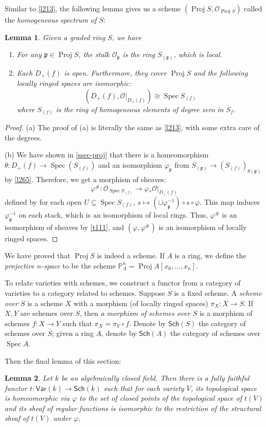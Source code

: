 \documentclass[12pt]{article}
\newtheorem{lemma}{Lemma}[subsection]
\theoremstyle{remark}
\newcommand{\Spec}[0]{\operatorname{Spec}}
\newcommand{\Proj}[0]{\operatorname{Proj}}
\newcommand{\Sch}[0]{\mathsf{Sch}}
\begin{document}
	Similar to \autoref{l213}, the following lemma gives us a scheme $(\Proj S, \mathscr O_{\Proj S})$ called the \textit{homogeneous spectrum of $S$}:
	\begin{lemma}\label{l271}
		Given a graded ring $S$, we have
		\begin{enumerate}[\normalfont(a)]
			\item For any $\mathfrak p\in\Proj S$, the stalk $\mathscr O_{\mathfrak p}$ is the ring $S_{(\mathfrak p)}$, which is local.
			\item Each $D_+(f)$ is open. Furthermore, they cover $\Proj S$ and the following locally ringed spaces are isomorphic:
				\[\left(D_+(f), \mathscr O|_{D_+(f)}\right)\cong\Spec S_{(f)}\]
			where $S_{(f)}$ is the ring of homogeneous elements of degree zero in $S_f$.
		\end{enumerate}
	\end{lemma}
	\begin{proof}
		(a) The proof of (a) is literally the same as \autoref{l213}, with some extra care of the degrees.

		(b) We have shown in \autoref{ssec-proj} that there is a homeomorphism $\theta:D_+(f)\to \Spec(S_{(f)})$ and an isomorphism $\varphi_{\mathfrak p}$ from $S_{(\mathfrak p)}\to (S_{(f)})_{\theta(\mathfrak p)}$ by \autoref{l265}. Therefore, we get a morphism of sheaves:
		\[\varphi^\#:\mathscr{O}_{\Spec S_{(f)}}\to \varphi_*\mathscr O|_{D_+(f)}\]
		defined by for each open $U\subseteq \Spec S_{(f)}$, $s\mapsto (\sqcup \varphi_{\mathfrak p}^{-1})\circ s\circ\varphi$. This map induces $\varphi_{\mathfrak p}^{-1}$ on each stack, which is an isomorphism of local rings. Thus, $\varphi^\#$ is an isomorphism of sheaves by \autoref{t111}, and $(\varphi,\varphi^\#)$ is an isomorphism of locally ringed spaces.
	\end{proof}

	We have proved that $\Proj S$ is indeed a scheme. If $A$ is a ring, we define the \textit{projective $n$-space} to be the scheme $\mathbb P^n_A=\Proj A[x_0,\dots, x_n]$.

	To relate varieties with schemes, we construct a functor from a category of varieties to a category related to schemes. Suppose $S$ is a fixed scheme. A \textit{scheme over $S$} is a scheme $X$ with a morphism (of locally ringed spaces) $\pi_X:X\to S$. If $X, Y$ are schemes over $S$, then \textit{a morphism of schemes over $S$} is a morphism of schemes $f:X\to Y$ such that $\pi_X=\pi_Y\circ f$. Denote by $\Sch(S)$ the category of schemes over $S$; given a ring $A$, denote by $\Sch(A)$ the category of schemes over $\Spec A$.

	Then the final lemma of this section:
	\begin{lemma}\label{l272}
		Let $k$ be an algebraically closed field. Then there is a fully faithful functor $t:\mathsf{Var}(k)\to\Sch(k)$ such that for each variety $V$, its topological space is homeomorphic via $\varphi$ to the set of closed points of the topological space of $t(V)$ and its sheaf of regular functions is isomorphic to the restriction of the structural sheaf of $t(V)$ under $\varphi$.
	\end{lemma}
\end{document}
